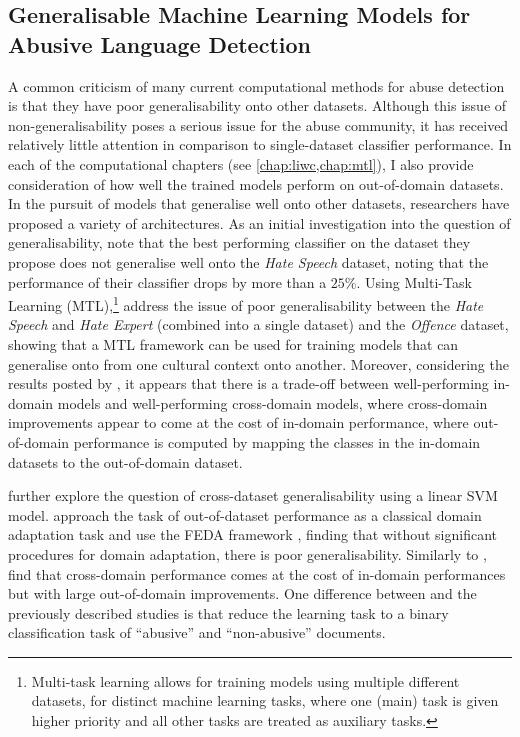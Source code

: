 \subsection{Generalisable Machine Learning Models for Abusive Language Detection}
A common criticism of many current computational methods for abuse detection is that they have poor generalisability onto other datasets. Although this issue of non-generalisability poses a serious issue for the abuse community, it has received relatively little attention \citep{Waseem:2016,Waseem:2018,Karan:2018,Wiegand:2019,Swamy:2019,Fortuna:2021,Glavas:2020} in comparison to single-dataset classifier performance. In each of the computational chapters (see \cref{chap:liwc,chap:mtl}), I also provide consideration of how well the trained models perform on out-of-domain datasets.
In the pursuit of models that generalise well onto other datasets, researchers have proposed a variety of architectures. As an initial investigation into the question of generalisability, \citet{Waseem:2016} note that the best performing classifier on the dataset they propose does not generalise well onto the \textit{Hate Speech} dataset, noting that the performance of their classifier drops by more than a $25\%$.
Using Multi-Task Learning (MTL),\footnote{Multi-task learning allows for training models using multiple different datasets, for distinct machine learning tasks, where one (main) task is given higher priority and all other tasks are treated as auxiliary tasks.} \citet{Waseem:2018} address the issue of poor generalisability between the \textit{Hate Speech} and \textit{Hate Expert} (combined into a single dataset) and the \textit{Offence} dataset, showing that a MTL framework can be used for training models that can generalise onto from one cultural context onto another. Moreover, considering the results posted by \citet{Waseem:2018}, it appears that there is a trade-off between well-performing in-domain models and well-performing cross-domain models, where cross-domain improvements appear to come at the cost of in-domain performance, where out-of-domain performance is computed by mapping the classes in the in-domain datasets to the out-of-domain dataset.

\citet{Karan:2018} further explore the question of cross-dataset generalisability using a linear SVM model. \citet{Karan:2018} approach the task of out-of-dataset performance as a classical domain adaptation task and use the FEDA framework \citep{Doume:2007}, finding that without significant procedures for domain adaptation, there is poor generalisability. Similarly to \citet{Waseem:2018}, \citet{Karan:2018} find that cross-domain performance comes at the cost of in-domain performances but with large out-of-domain improvements. One difference between \citet{Karan:2018} and the previously described studies is that \citet{Karan:2018} reduce the learning task to a binary classification task of ``abusive'' and ``non-abusive'' documents.

